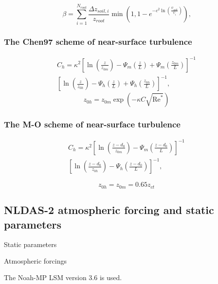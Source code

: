 \documentclass[essd]{copernicus}
\begin{document}
\begin{equation}
    \beta = \sum_{i=1}^{N_{root}} \frac{\Delta z_{soil,i}}{z_{root}}
    \min\left(1,
    1 - e^{-c^2 \ln\left(\frac{\psi_{wilt}}{\psi_{i}} \right)} \right) \text{,}
\end{equation}

\subsubsection{The Chen97 scheme of near-surface turbulence}

\begin{multline}
    C_h = \kappa^2 \left[ \ln\left(\frac{z}{z_{0m}}\right)
        - \Psi_{m}\left(\frac{z}{L}\right)
        + \Psi_{m}\left(\frac{z_{0m}}{L}\right) \right]^{-1} \\
    \left[ \ln\left(\frac{z}{z_{0h}}\right)
        - \Psi_{h}\left(\frac{z}{L}\right)
        + \Psi_{h}\left(\frac{z_{0h}}{L}\right) \right]^{-1} \text{,}
\end{multline}
\begin{equation}
    z_{0h} = z_{0m} \exp\left(-\kappa C \sqrt{\text{Re}^*}\right)
\end{equation}

\subsubsection{The M-O scheme of near-surface turbulence}

\begin{multline}
    C_h = \kappa^2 \left[ \ln\left(\frac{z-d_0}{z_{0m}}\right)
        - \Psi_{m}\left(\frac{z-d_0}{L}\right) \right]^{-1} \\
    \left[ \ln\left(\frac{z-d_0}{z_{0h}}\right)
        - \Psi_{h}\left(\frac{z-d_0}{L}\right) \right]^{-1}
    \text{,}
\end{multline}

\begin{equation}
    z_{0h} = z_{0m} = 0.65 z_{ct}
\end{equation}


\subsection{NLDAS-2 atmospheric forcing and static parameters}\label{sec:data:nldas}

Static parameters

Atmospheric forcings

The Noah-MP LSM version 3.6 is used.
\end{document}

